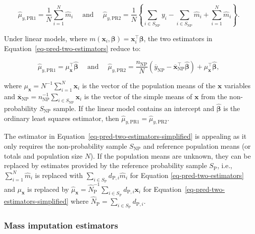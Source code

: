 \documentclass[nojss]{jss}
\begin{document}
\begin{equation}
\hat{\mu}_{y,\text{PR1}}=\frac{1}{N} \sum_{i=1}^N \hat{m}_i \quad \text { and } \quad \hat{\mu}_{y,\text{PR2}}=\frac{1}{N}\left\{\sum_{i \in S_{\text{NP}}} y_i-\sum_{i \in S_{\text{NP}}} \hat{m}_i+\sum_{i=1}^N \hat{m}_i\right\}.
\label{eq-pred-two-estimators}
\end{equation}

Under linear models, where
\(m(\boldsymbol{x}_i, \boldsymbol{\beta})=\boldsymbol{x}_i^{\top}\boldsymbol{\beta}\),
the two estimators in Equation~\ref{eq-pred-two-estimators} reduce to:

\begin{equation}
\hat{\mu}_{y,\text{PR1}}=\mu_{\boldsymbol{x}}^{\top} \hat{\boldsymbol{\beta}} \quad \text { and } \quad \hat{\mu}_{y,\text{PR2}}=\frac{n_{\text{NP}}}{N}\left(\overline{y}_{\text{NP}}-\overline{\boldsymbol{x}}_{\text{NP}}^{\top} \hat{\boldsymbol{\beta}}\right)+\mu_{\boldsymbol{x}}^{\top} \hat{\boldsymbol{\beta}},
\label{eq-pred-two-estimators-simplified}
\end{equation}

where \(\mu_{\boldsymbol{x}} = N^{-1}\sum_{i=1}^N\boldsymbol{x}_i\) is
the vector of the population means of the \(\boldsymbol{x}\) variables
and
\(\overline{\boldsymbol{x}}_{\text{NP}}=n_{\text{NP}}^{-1}\sum_{i \in S_{\text{NP}}}\boldsymbol{x}_i\)
is the vector of the simple means of \(\boldsymbol{x}\) from the
non-probability \(S_{\text{NP}}\) sample. If the linear model contains
an intercept and \(\hat{\boldsymbol{\beta}}\) is the ordinary least
squares estimator, then
\(\hat{\mu}_{y,\text{PR1}}=\hat{\mu}_{y,\text{PR2}}\).

The estimator in Equation~\ref{eq-pred-two-estimators-simplified} is
appealing as it only requires the non-probability sample
\(S_{\text{NP}}\) and reference population means (or totals and
population size \(N\)). If the population means are unknown, they can be
replaced by estimates provided by the reference probability sample
\(S_{\text{P}}\), i.e., \(\sum_{i=1}^N \hat{m}_i\) is replaced with
\(\sum_{i \in S_{\text{P}}} d_{\text{P},i}\hat{m}_i\) for Equation
\ref{eq-pred-two-estimators} and \(\mu_{\boldsymbol{x}}\) is replaced by
\(\hat{\mu}_{\boldsymbol{x}}=\hat{N}_{\text{P}}^{-1}\sum_{i \in S_{\text{P}}}d_{\text{P},i}\boldsymbol{x}_i\)
for Equation~\ref{eq-pred-two-estimators-simplified} where
\(\hat{N}_{\text{P}}=\sum_{i \in S_{\text{P}}}d_{\text{P},i}\).

\subsubsection{Mass imputation
estimators}\label{mass-imputation-estimators}
\end{document}
